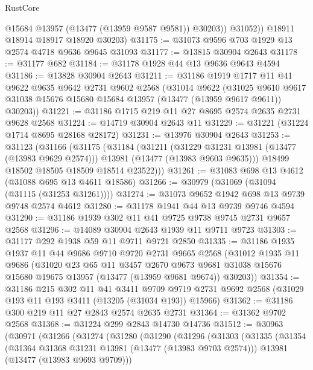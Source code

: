 \begin{lexlean}{RustCore}
\begin{coremodule}
              @15684
              @13957
              (@13477 (@13959 @9587 @9581))
              @30203))
          @31052))
      @18911
      @18914
      @18917
      @18920
      @30203)
@31175 := @31073 @9596 @703 @1929 @13 @2574 @4718 @9636 @9645 @31093
@31177 := @13815 @30904 @2643
@31178 := @31177 @682
@31184 := @31178 @1928 @44 @13 @9636 @9643 @4594
@31186 := @13828 @30904 @2643
@31211 := @31186
    @1919
    @1717
    @11
    @41
    @9622
    @9635
    @9642
    @2731
    @9602
    @2568
    (@31014
      @9622
      (@31025 @9610 @9617 @31038 @15676 @15680 @15684 @13957 (@13477 (@13959 @9617 @9611)) @30203))
@31221 := @31186 @1715 @219 @11 @27 @8695 @2574 @2635 @2731 @9628 @2568
@31224 := @14719 @30904 @2643 @11
@31229 := @31221 (@31224 @1714 @8695 @28168 @28172)
@31231 := @13976 @30904 @2643
@31253 := @31123
    (@31166
      (@31175
        (@31184
          (@31211
            (@31229 @31231 @13981 (@13477 (@13983 @9629 @2574)))
            @13981
            (@13477 (@13983 @9603 @9635)))
          @18499
          @18502
          @18505
          @18509
          @18514
          @23522)))
@31261 := @31083 @698 @13 @4612 (@31088 @695 @13 @4611 @18586)
@31266 := @30979 (@31069 (@31094 (@31115 (@31253 @31261))))
@31274 := @31073 @9652 @1942 @698 @13 @9739 @9748 @2574 @4612
@31280 := @31178 @1941 @44 @13 @9739 @9746 @4594
@31290 := @31186 @1939 @302 @11 @41 @9725 @9738 @9745 @2731 @9657 @2568
@31296 := @14089 @30904 @2643 @1939 @11 @9711 @9723
@31303 := @31177 @292 @1938 @59 @11 @9711 @9721 @2850
@31335 := @31186
    @1935
    @1937
    @11
    @44
    @9686
    @9710
    @9720
    @2731
    @9665
    @2568
    (@31012
      @1935
      @11
      @9686
      (@31020
        @23
        @65
        @11
        @3457
        @2670
        @9673
        @9681
        @31038
        @15676
        @15680
        @19675
        @13957
        (@13477 (@13959 @9681 @9674))
        @30203))
@31354 := @31186
    @215
    @302
    @11
    @41
    @3411
    @9709
    @9719
    @2731
    @9692
    @2568
    (@31029 @193 @11 @193 @3411 (@13205 (@31034 @193)) @15966)
@31362 := @31186 @300 @219 @11 @27 @2843 @2574 @2635 @2731
@31364 := @31362 @9702 @2568
@31368 := @31224 @299 @2843 @14730 @14736
@31512 := @30963
    (@30971
      (@31266
        (@31274
          (@31280
            (@31290
              (@31296
                (@31303
                  (@31335
                    (@31354
                      (@31364 @31368 @31231 @13981 (@13477 (@13983 @9703 @2574)))
                      @13981
                      (@13477 (@13983 @9693 @9709)))

\end{coremodule}
\end{lexlean}
